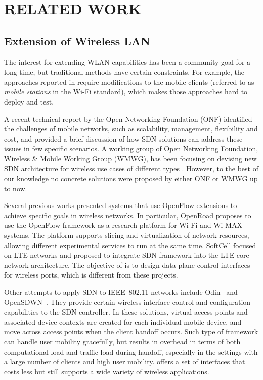 \chapter{\uppercase {Related Work}}
\label{sec:related}
\section{Extension of Wireless LAN} 

The interest for extending WLAN capabilities has been a community goal for a long time, but traditional methods have certain constraints. For example, the approaches reported in \cite{murty10dyson,shrivastava09centaur} require modifications to the mobile clients (referred to as \emph{mobile stations} in the Wi-Fi standard), which makes those approaches hard to deploy and test.

A recent technical report by the Open Networking Foundation (ONF) \cite{onf13enabled} identified the challenges of mobile  networks, such as scalability, management, flexibility and cost, and provided a brief discussion of how SDN solutions can address these issues in few specific scenarios. A working group of Open Networking Foundation, Wireless \& Mobile Working Group (WMWG), has been focusing on devising new SDN architecture for wireless use cases of different types \cite{onf-wmwg:proposal}. However, to the best of our knowledge no concrete solutions were proposed by either ONF or WMWG up to now.

Several previous works presented systems that use OpenFlow extensions to achieve specific goals in wireless networks. In particular, OpenRoad \cite{yap10openroads, yap10blueprint, yap09stanford} proposes to use the OpenFlow framework as a research platform for Wi-Fi and Wi-MAX systems. The platform supports  slicing and virtualization of network resources, allowing different experimental  services to run at the same time. SoftCell \cite{jin13softcell} focused on LTE networks and proposed to integrate SDN framework into the LTE core network architecture.  The objective of \aetherflow is to design data plane control interfaces for wireless ports, which is different from these projects.

Other attempts to apply SDN to IEEE~802.11 networks include Odin~\cite{suresh12odin} and OpenSDWN~\cite{schulz15opensdwn}. They provide certain wireless interface control and configuration capabilities to the SDN controller. In these solutions, virtual access points and associated device contexts are created for each individual mobile device, and move across access points when the client handoff occurs. Such type of framework can handle user mobility gracefully, but results in overhead in terms of both computational load and traffic load during handoff, especially in the settings with a large number of clients and high user mobility. \aetherflow offers a set of interfaces that costs less but still supports a wide variety of wireless applications.

